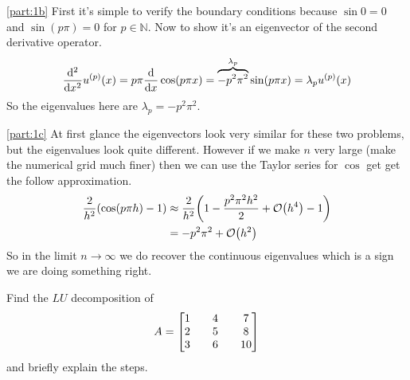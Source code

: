 \documentclass[boxes,pages]{homework}
\begin{document}
\begin{solution}
	\ref{part:1b}
	First it's simple to verify the boundary conditions because $\sin 0 = 0$ and $\sin(p\pi) = 0$ for $p\in\mathbb{N}$. Now to show it's an eigenvector of the second derivative operator.
	\begin{equation*}
		\dv[2]{x}u^{(p)}(x) = p\pi\dv{x}\cos(p\pi x) = \overbrace{-p^2\pi^2}^{\lambda_p}\sin(p\pi x) = \lambda_pu^{(p)}(x)
	\end{equation*}
	So the eigenvalues here are $\lambda_p = -p^2\pi^2$.

	\ref{part:1c}
	At first glance the eigenvectors look very similar for these two problems, but the eigenvalues look quite different. However if we make $n$ very large (make the numerical grid much finer) then we can use the Taylor series for $\cos$ get get the follow approximation.
	\begin{align*}
		\frac{2}{h^2}\qty(\cos(p\pi h) - 1) & \approx\frac{2}{h^2}\qty(1 - \frac{p^2\pi^2h^2}{2} + \order{h^4}- 1) \\
		                                    & =-p^2\pi^2 + \order{h^2}
	\end{align*}
	So in the limit $n\to\infty$ we do recover the continuous eigenvalues which is a sign we are doing something right.
\end{solution}

\begin{problem}
Find the $LU$ decomposition of
\begin{equation*}
	A = \mqty[1 && 4 && 7 \\ 2 && 5 && 8 \\ 3 && 6 && 10]
\end{equation*}
and briefly explain the steps.
\end{problem}
\end{document}
